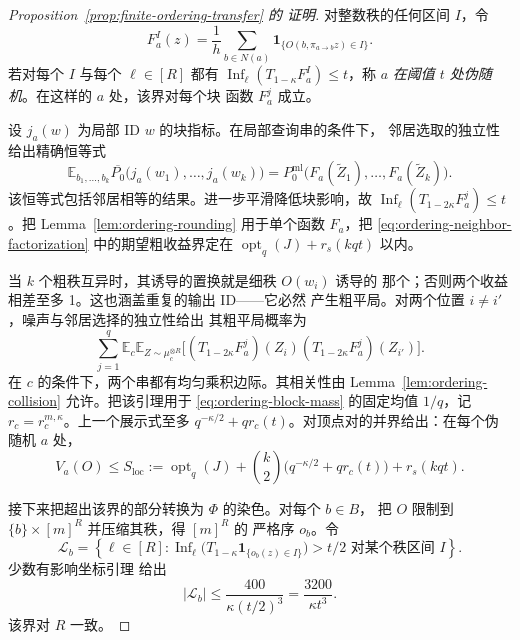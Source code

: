 \begin{proof}[Proposition~\ref{prop:finite-ordering-transfer} 的
证明]
对整数秩的任何区间 \(I\)，令
\[
 F_a^I(z)=\frac1h\sum_{b\in N(a)}
   \mathbf1_{\{O(b,\pi_{a\to b}z)\in I\}}.
\]
若对每个 \(I\) 与每个 \(\ell\in[R]\) 都有
\(\operatorname{Inf}_\ell(T_{1-\kappa}F_a^I)\le t\)，称 \(a\)
\emph{在阈值 \(t\) 处伪随机}。在这样的 \(a\) 处，该界对每个块
函数 \(F_a^j\) 成立。

设 \(j_a(w)\) 为局部 ID \(w\) 的块指标。在局部查询串的条件下，
邻居选取的独立性给出精确恒等式
\begin{equation}
 \mathbb E_{b_1,\ldots,b_k}
 \overline{P_0}\bigl(j_a(w_1),\ldots,j_a(w_k)\bigr)
 =
 P_0^{\mathrm{ml}}\bigl(F_a(\widetilde Z_1),\ldots,
                         F_a(\widetilde Z_k)\bigr).
\label{eq:ordering-neighbor-factorization}
\end{equation}
该恒等式包括邻居相等的结果。进一步平滑降低块影响，故
\(\operatorname{Inf}_\ell(T_{1-2\kappa}F_a^j)\le t\)。把
Lemma~\ref{lem:ordering-rounding} 用于单个函数 \(F_a\)，把
\eqref{eq:ordering-neighbor-factorization} 中的期望粗收益界定在
\(\operatorname{opt}_q(J)+r_s(kqt)\) 以内。

当 \(k\) 个粗秩互异时，其诱导的置换就是细秩 \(O(w_i)\) 诱导的
那个；否则两个收益相差至多 1。这也涵盖重复的输出 ID——它必然
产生粗平局。对两个位置 \(i\ne i'\)，噪声与邻居选择的独立性给出
其粗平局概率为
\[
 \sum_{j=1}^q
 \mathbb E_c\mathbb E_{Z\sim\mu_c^{\otimes R}}
 \bigl[
  (T_{1-2\kappa}F_a^j)(Z_i)
  (T_{1-2\kappa}F_a^j)(Z_{i'})
 \bigr].
\]
在 \(c\) 的条件下，两个串都有均匀乘积边际。其相关性由
Lemma~\ref{lem:ordering-collision} 允许。把该引理用于
\eqref{eq:ordering-block-mass} 的固定均值 \(1/q\)，记
\(r_c=r_c^{m,\kappa}\)。上一个展示式至多
\(q^{-\kappa/2}+q r_c(t)\)。对顶点对的并界给出：在每个伪随机
\(a\) 处，
\begin{equation}
 V_a(O)\le
 S_{\mathrm{loc}}:=\operatorname{opt}_q(J)
 +\binom{k}{2}\bigl(q^{-\kappa/2}+q r_c(t)\bigr)
 +r_s(kqt).
\label{eq:ordering-pseudorandom-bound}
\end{equation}

接下来把超出该界的部分转换为 \(\Phi\) 的染色。对每个 \(b\in B\)，
把 \(O\) 限制到 \(\{b\}\times[m]^R\) 并压缩其秩，得 \([m]^R\) 的
严格序 \(o_b\)。令
\[
 \mathcal L_b=\left\{\ell\in[R]:
   \operatorname{Inf}_\ell
    \bigl(T_{1-\kappa}\mathbf1_{\{o_b(z)\in I\}}\bigr)>t/2
   \text{ 对某个秩区间 }I\right\}.
\]
少数有影响坐标引理
\cite[Definition~4.2 and Lemma~4.3]{GuruswamiEtAl2011OrderingCSP}
给出
\begin{equation}
 |\mathcal L_b|\le\frac{400}{\kappa(t/2)^3}
 =\frac{3200}{\kappa t^3}.
\label{eq:ordering-right-candidates}
\end{equation}
该界对 \(R\) 一致。


\end{proof}

